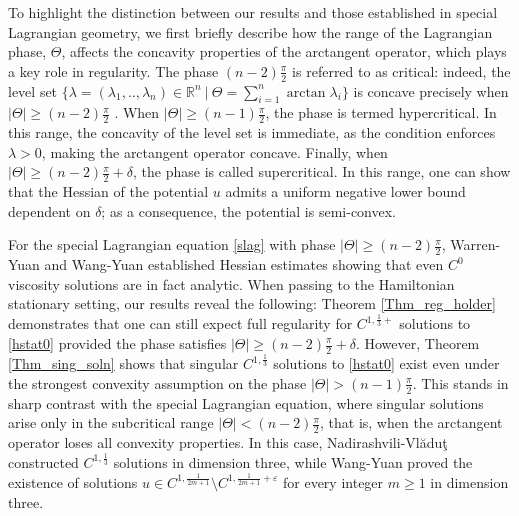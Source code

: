 \documentclass[12pt,reqno]{amsart}%
\theoremstyle{plain}
\numberwithin{equation}{section}
\theoremstyle{definition}
\theoremstyle{remark}
\begin{document}
To highlight the distinction between our results and those established in special Lagrangian geometry, we first briefly describe how the range of the Lagrangian phase, $\Theta$, affects the concavity properties of the arctangent operator, which plays a key role in regularity. The phase $(n-2)\frac{\pi}{2}$ is referred to as critical: indeed, the level set $\{ \lambda=(\lambda_1,..,\lambda_n) \in \mathbb{R}^n \: \vert \:  \Theta=\sum_{i=1}^n \arctan \lambda_i\}$ is concave precisely when $|\Theta|\geq (n-2)\frac{\pi}{2}$ \cite[Lemma 2.2]{YY06}. When $|\Theta|\geq (n-1)\frac{\pi}{2}$, the phase is termed hypercritical. In this range, the concavity of the level set is immediate, as the condition enforces $\lambda > 0$, making the arctangent operator concave. Finally, when $|\Theta|\geq (n-2)\frac{\pi}{2}+\delta$, the phase is called supercritical. In this range, one can show that the Hessian of the potential $u$ admits a uniform negative lower bound dependent on $\delta$; as a consequence, the potential is semi-convex.


For the special Lagrangian equation \eqref{slag} with phase $|\Theta|\geq (n-2)\frac{\pi}{2}$, Warren-Yuan \cite{WY9,WY} and Wang-Yuan \cite{WaY} established Hessian estimates showing that even $C^{0}$ viscosity solutions are in fact analytic. When passing to the Hamiltonian stationary setting, our results reveal the following:  Theorem \ref{Thm_reg_holder} demonstrates that one can still expect full regularity for $C^{1,\frac{1}{3}+}$ solutions to \eqref{hstat0} provided the phase satisfies $|\Theta|\geq (n-2)\frac{\pi}{2}+\delta$. However, Theorem \ref{Thm_sing_soln} shows that singular $C^{1,\frac{1}{3}}$ solutions to \eqref{hstat0} exist even under the strongest convexity assumption on the phase $|\Theta|> (n-1)\frac{\pi}{2}$. This stands in sharp contrast with the special Lagrangian equation, where singular solutions arise only in the subcritical range $|\Theta|<(n-2)\frac{\pi}{2}$, that is, when the arctangent operator loses all convexity properties. In this case, Nadirashvili-Vl\u{a}du\c{t} \cite{NV} constructed $C^{1,\frac{1}{3}}$ solutions in dimension three, while Wang-Yuan \cite{WangY} proved the existence of solutions $u \in C^{1,\frac{1}{2m+1}} \setminus C^{1,\frac{1}{2m+1}+\varepsilon}$ for every integer $m \geq 1$ in dimension three.
\end{document}
